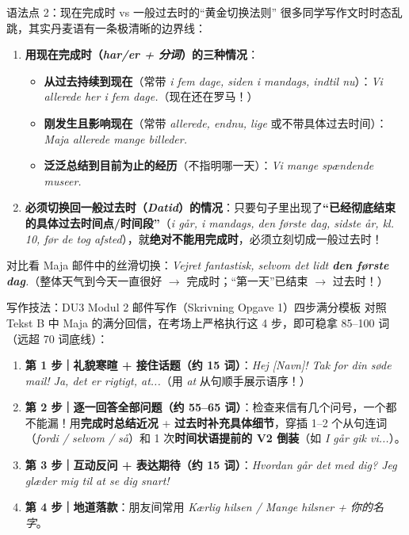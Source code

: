 \begin{grammatikbox}{语法点 2：现在完成时 vs 一般过去时的“黄金切换法则”}
很多同学写作文时时态乱跳，其实丹麦语有一条极清晰的边界线：
\begin{enumerate}
  \item \textbf{用现在完成时（\textit{har/er + 分词}）的三种情况}：
    \begin{itemize}
      \item \textbf{从过去持续到现在}（常带 \textit{i fem dage, siden i mandags, indtil nu}）：\textit{Vi  allerede  her i fem dage.}（现在还在罗马！）
      \item \textbf{刚发生且影响现在}（常带 \textit{allerede, endnu, lige} 或不带具体过去时间）：\textit{Maja  allerede  mange billeder.}
      \item \textbf{泛泛总结到目前为止的经历}（不指明哪一天）：\textit{Vi  mange spændende museer.}
    \end{itemize}
  \item \textbf{必须切换回一般过去时（\textit{Datid}）的情况}：只要句子里出现了\textbf{“已经彻底结束的具体过去时间点/时间段”}（\textit{i går, i mandags, den første dag, sidste år, kl. 10, før de tog afsted}），就\textbf{绝对不能用完成时}，必须立刻切成一般过去时！
\end{enumerate}
对比看 Maja 邮件中的丝滑切换：\textit{Vejret  fantastisk, selvom det  lidt \textbf{den første dag}.}（整体天气到今天一直很好 $\rightarrow$ 完成时；“第一天”已结束 $\rightarrow$ 过去时！）
\end{grammatikbox}

\begin{grammatikbox}{写作技法：DU3 Modul 2 邮件写作（Skrivning Opgave 1）四步满分模板}
对照 Tekst B 中 Maja 的满分回信，在考场上严格执行这 4 步，即可稳拿 85--100 词（远超 70 词底线）：
\begin{enumerate}
  \item \textbf{第 1 步｜礼貌寒暄 + 接住话题（约 15 词）}：\textit{Hej [Navn]! Tak for din søde mail! Ja, det er rigtigt, at...}（用 \textit{at} 从句顺手展示语序！）
  \item \textbf{第 2 步｜逐一回答全部问题（约 55--65 词）}：检查来信有几个问号，一个都不能漏！用\textbf{完成时总结近况} + \textbf{过去时补充具体细节}，穿插 1--2 个从句连词（\textit{fordi / selvom / så}）和 1 次\textbf{时间状语提前的 V2 倒装}（如 \textit{I går gik vi...}）。
  \item \textbf{第 3 步｜互动反问 + 表达期待（约 15 词）}：\textit{Hvordan går det med dig? Jeg glæder mig til at se dig snart!}
  \item \textbf{第 4 步｜地道落款}：朋友间常用 \textit{Kærlig hilsen / Mange hilsner + 你的名字}。
\end{enumerate}
\end{grammatikbox}

